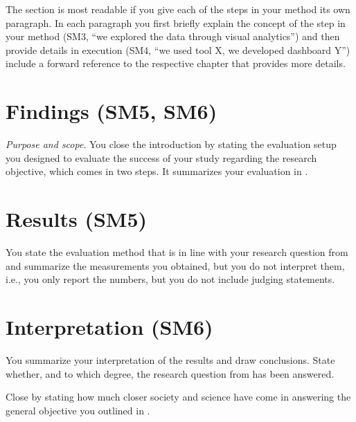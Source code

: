 The section is most readable if you give each of the steps in your method its own paragraph.
In each paragraph you first briefly explain the concept of the step in your method (SM3, ``we explored the data through visual analytics'') and then provide details in execution (SM4, ``we used tool X, we developed dashboard Y'') include a forward reference to the respective chapter that provides more details.

\section{Findings (SM5, SM6)}\label{sec:introduction:results}

\emph{Purpose and scope}.
You close the introduction by stating the evaluation setup you designed to evaluate the success of your study regarding the research objective, which comes in two steps.
It summarizes your evaluation in .

\section*{Results (SM5)}

You state the evaluation method that is in line with your research question from  and summarize the measurements you obtained, but you do not interpret them, i.e., you only report the numbers, but you do not include judging statements.

\section*{Interpretation (SM6)}

You summarize your interpretation of the results and draw conclusions.
State whether, and to which degree, the research question from  has been answered.

Close by stating how much closer society and science have come in answering the general objective you outlined in .
